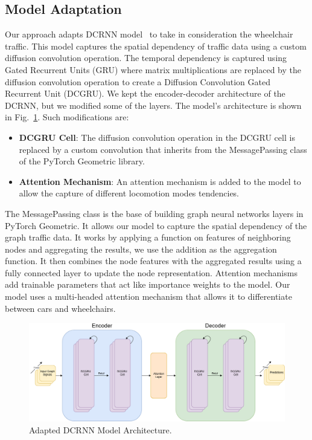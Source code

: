 \subsection{Model Adaptation}\label{subsec:model-adaptation}
Our approach adapts DCRNN model~\cite{DCRNN} to take in consideration the wheelchair traffic.
This model captures the spatial dependency of traffic data using a custom diffusion convolution operation.
The temporal dependency is captured using Gated Recurrent Units (GRU) where matrix multiplications are replaced by
the diffusion convolution operation to create a Diffusion Convolution Gated Recurrent Unit (DCGRU).
We kept the encoder-decoder architecture of the DCRNN, but we modified some of the layers.
The model's architecture is shown in Fig.~\ref{fig:model}.
Such modifications are:

\begin{itemize}
    \item \textbf{DCGRU Cell}:
    The diffusion convolution operation in the DCGRU cell is replaced by a custom convolution that inherits from the MessagePassing class of the PyTorch Geometric library.
    \item \textbf{Attention Mechanism}:
    An attention mechanism is added to the model to allow the capture of different locomotion modes tendencies.
\end{itemize}
\vspace{1em}

The MessagePassing class is the base of building graph neural networks layers in PyTorch Geometric.
It allows our model to capture the spatial dependency of the graph traffic data.
It works by applying a function on features of neighboring nodes and aggregating the results, we use the addition as the aggregation function.
It then combines the node features with the aggregated results using a fully connected layer to update the node representation.
Attention mechanisms add trainable parameters that act like importance weights to the model.
Our model uses a multi-headed attention mechanism that allows it to differentiate between cars and wheelchairs.
\vspace{1em}

\begin{figure}[htbp]
    \centering
    \includegraphics[width=1\textwidth]{resources/model}
    \caption{
        Adapted DCRNN Model Architecture.
    }
    \label{fig:model}
\end{figure}

